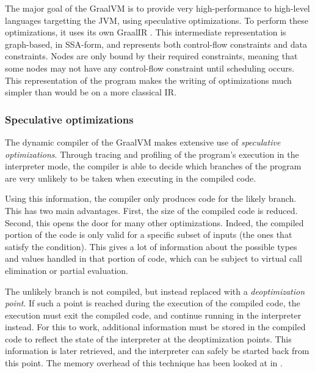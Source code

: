 \documentclass[twoside,11pt,a4paper]{article}
\begin{document}
The major goal of the GraalVM is to provide very high-performance to high-level languages targetting the JVM, using speculative optimizations. To perform these optimizations, it uses its own GraalIR \cite{graalir, graalspecoptir}. This intermediate representation is graph-based, in SSA-form, and represents both control-flow constraints and data constraints. Nodes are only bound by their required constraints, meaning that some nodes may not have any control-flow constraint until scheduling occurs. This representation of the program makes the writing of optimizations much simpler than would be on a more classical IR.




\subsubsection{Speculative optimizations}

The dynamic compiler of the GraalVM makes extensive use of \textit{speculative optimizations}. Through tracing and profiling of the program's execution in the interpreter mode, the compiler is able to decide which branches of the program are very unlikely to be taken when executing in the compiled code.

Using this information, the compiler only produces code for the likely branch. This has two main advantages. First, the size of the compiled code is reduced. Second, this opens the door for many other optimizations. Indeed, the compiled portion of the code is only valid for a specific subset of inputs (the ones that satisfy the condition). This gives a lot of information about the possible types and values handled in that portion of code, which can be subject to virtual call elimination or partial evaluation.

The unlikely branch is not compiled, but instead replaced with a \textit{deoptimization point}. If such a point is reached during the execution of the compiled code, the execution must exit the compiled code, and continue running in the interpreter instead. For this to work, additional information must be stored in the compiled code to reflect the state of the interpreter at the deoptimization points. This information is later retrieved, and the interpreter can safely be started back from this point. The memory overhead of this technique has been looked at in \cite{graaldatacompression}.
\end{document}
